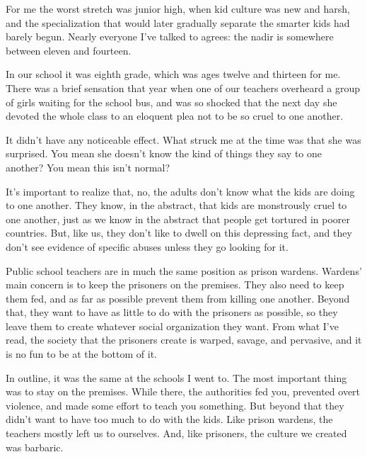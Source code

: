                   For me the worst stretch was junior high, when kid culture was
                  new and harsh, and the specialization that would later
                  gradually separate the smarter kids had barely begun. Nearly
                  everyone I've talked to agrees: the nadir is somewhere between
                  eleven and fourteen.

In our school it was eighth
                  grade, which was ages twelve and thirteen for me. There was a
                  brief sensation that year when one of our teachers overheard a
                  group of girls waiting for the school bus, and was so shocked
                  that the next day she devoted the whole class to an eloquent
                  plea not to be so cruel to one another.

It didn't
                  have any noticeable effect. What struck me at the time was
                  that she was surprised. You mean she doesn't know the kind of
                  things they say to one another? You mean this isn't normal?

It's
                  important to realize that, no, the adults don't know what the
                  kids are doing to one another. They know, in the abstract,
                  that kids are monstrously cruel to one another, just as we
                  know in the abstract that people get tortured in poorer
                  countries. But, like us, they don't like to dwell on this
                  depressing fact, and they don't see evidence of specific
                  abuses unless they go looking for it.

Public school
                  teachers are in much the same position as prison wardens.
                  Wardens' main concern is to keep the prisoners on the
                  premises. They also need to keep them fed, and as far as
                  possible prevent them from killing one another. Beyond that,
                  they want to have as little to do with the prisoners as
                  possible, so they leave them to create whatever social
                  organization they want. From what I've read, the society that
                  the prisoners create is warped, savage, and pervasive, and it
                  is no fun to be at the bottom of it.

In outline, it
                  was the same at the schools I went to. The most important
                  thing was to stay on the premises. While there, the
                  authorities fed you, prevented overt violence, and made some
                  effort to teach you something. But beyond that they didn't
                  want to have too much to do with the kids. Like prison
                  wardens, the teachers mostly left us to ourselves. And, like
                  prisoners, the culture we created was barbaric.




